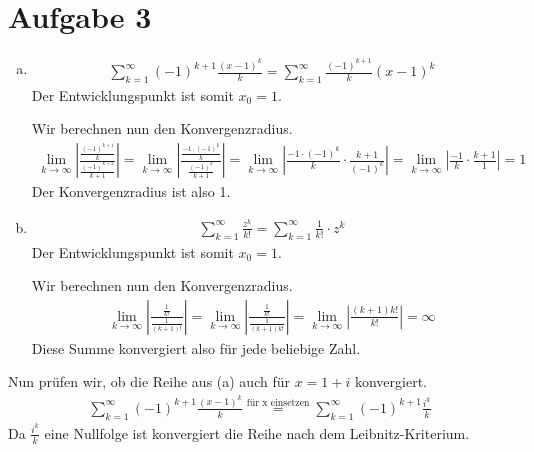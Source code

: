\documentclass[10pt,a4paper,parskip=half]{scrartcl}
\begin{document}
\section*{Aufgabe 3}
\begin{enumerate}[a)]
\item 
\begin{align*}
\sum_{k=1}^{\infty}(-1)^{k+1}\frac{(x-1)^k}{k} = \sum_{k=1}^{\infty} \frac{(-1)^{k+1}}{k}(x-1)^k
\end{align*}
Der Entwicklungspunkt ist somit $x_0 = 1$.

Wir berechnen nun den Konvergenzradius.
\begin{align*}
\lim_{k\to\infty} \left|\frac{\frac{(-1)^{k+1}}{k}}{\frac{(-1)^{k+2}}{k+1}}\right| = \lim_{k\to\infty} \left|\frac{\frac{-1\cdot(-1)^{k}}{k}}{\frac{(-1)^{k}}{k+1}}\right| = \lim_{k\to\infty} \left|\frac{-1\cdot(-1)^{k}}{k} \cdot \frac{k+1}{(-1)^{k}}\right| = \lim_{k\to\infty} \left|\frac{-1}{k} \cdot \frac{k+1}{1}\right| = 1
\end{align*}
Der Konvergenzradius ist also 1.
\item
\begin{align*}
\sum_{k=1}^{\infty} \frac{z^k}{k!} = \sum_{k=1}^{\infty} \frac{1}{k!} \cdot z^k
\end{align*}
Der Entwicklungspunkt ist somit $x_0 = 1$.

Wir berechnen nun den Konvergenzradius.
\begin{align*}
\lim_{k\to\infty} \left|\frac{\frac 1 {k!}}{\frac 1 {(k+1)!}}\right| = \lim_{k\to\infty} \left|\frac{\frac 1 {k!}}{\frac 1 {(k+1) k!}}\right| = \lim_{k\to\infty} \left|\frac {(k+1) k!} {k!}\right| = \infty
\end{align*}
Diese Summe konvergiert also für jede beliebige Zahl.
\end{enumerate}
Nun prüfen wir, ob die Reihe aus (a) auch für $x=1+i$ konvergiert. 
\begin{align*}
\sum_{k=1}^{\infty}(-1)^{k+1}\frac{(x-1)^k}{k} \overset{\text{für x einsetzen}}{=} \sum_{k=1}^{\infty}(-1)^{k+1}\frac{i^k}{k}
\end{align*}
Da $\frac{i^k}{k}$ eine Nullfolge ist konvergiert die Reihe nach dem Leibnitz-Kriterium.
\end{document}
